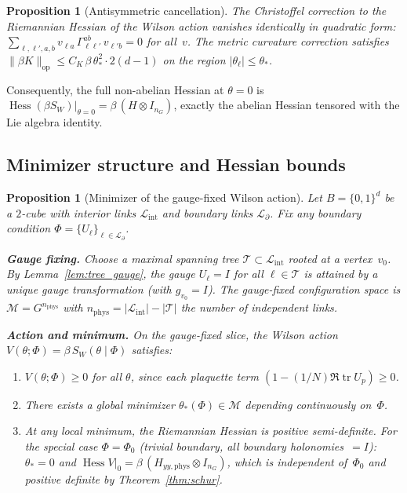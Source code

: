 \documentclass[11pt,a4paper]{article}
\theoremstyle{plain}
\newtheorem{proposition}[theorem]{Proposition}
\theoremstyle{definition}
\theoremstyle{remark}
\newcommand{\tr}{\operatorname{tr}}
\newcommand{\Hess}{\operatorname{Hess}}
\begin{document}
\begin{proposition}[Antisymmetric cancellation]
\label{prop:antisym}
The Christoffel correction to the Riemannian Hessian of
the Wilson action vanishes identically in quadratic form:
$\sum_{\ell,\ell',a,b} v_{\ell a}\,\Gamma_{\ell\ell'}^{ab}
\,v_{\ell' b} = 0$ for all~$v$.
The metric curvature correction satisfies
$\|\beta K\|_{\mathrm{op}} \leq C_K\,\beta\,\theta_*^2
\cdot 2(d{-}1)$ on the region $|\theta_\ell| \leq \theta_*$.
\end{proposition}

\noindent Consequently, the full non-abelian Hessian at $\theta = 0$ is
$\Hess(\beta S_W)|_{\theta=0} = \beta\,(H \otimes I_{n_G})$,
exactly the abelian Hessian tensored with the Lie algebra identity.

\subsection{Minimizer structure and Hessian bounds}

\begin{proposition}[Minimizer of the gauge-fixed Wilson action]
\label{prop:unique_min}
Let $B = \{0,1\}^d$ be a $2$-cube with interior links
$\mathcal{L}_{\mathrm{int}}$ and boundary links
$\mathcal{L}_{\partial}$.  Fix any boundary
condition $\Phi = \{U_\ell\}_{\ell \in \mathcal{L}_\partial}$.

\textbf{Gauge fixing.}
Choose a maximal spanning tree
$\mathcal{T} \subset \mathcal{L}_{\mathrm{int}}$
rooted at a vertex~$v_0$.
By Lemma~\ref{lem:tree_gauge}, the gauge
$U_\ell = I$ for all $\ell \in \mathcal{T}$
is attained by a unique gauge transformation
(with $g_{v_0} = I$).  The gauge-fixed
configuration space
is $\mathcal{M} = G^{n_{\mathrm{phys}}}$ with
$n_{\mathrm{phys}} = |\mathcal{L}_{\mathrm{int}}|
- |\mathcal{T}|$ the number of independent links.

\textbf{Action and minimum.}
On the gauge-fixed slice, the Wilson action
$V(\theta; \Phi) = \beta\,S_W(\theta \mid \Phi)$
satisfies:
\begin{enumerate}[label=\textup{(\roman*)},nosep]
  \item $V(\theta; \Phi) \geq 0$ for all $\theta$,
    since each plaquette term
    $(1 - (1/N)\Re\tr U_p) \geq 0$.
  \item There exists a global minimizer
    $\theta_*(\Phi) \in \mathcal{M}$ depending
    continuously on~$\Phi$.
  \item At any local minimum, the Riemannian Hessian
    is positive semi-definite.  For the special case
    $\Phi = \Phi_0$ \textup{(}trivial boundary,
    all boundary holonomies~$= I$\textup{)}:
    $\theta_* = 0$ and $\Hess V|_0 =
    \beta\,(H_{yy,\mathrm{phys}} \otimes I_{n_G})$,
    which is independent of~$\Phi_0$ and positive
    definite by Theorem~\ref{thm:schur}.
\end{enumerate}
\end{proposition}
\end{document}

